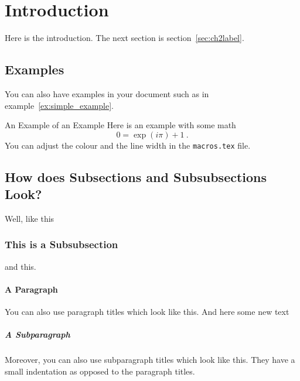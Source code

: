 \section{Introduction}\label{sec:introduction}
Here is the introduction. The next section is section~\ref{sec:ch2label}.

\subsection{Examples}
You can also have examples in your document such as in example~\ref{ex:simple_example}.
\begin{example}{An Example of an Example}
  \label{ex:simple_example}
  Here is an example with some math
  \begin{equation}
    0 = \exp(i\pi)+1\ .
  \end{equation}
  You can adjust the colour and the line width in the {\tt macros.tex} file.
\end{example}

\subsection{How does Subsections and Subsubsections Look?}
Well, like this
\subsubsection{This is a Subsubsection}
and this.

\paragraph{A Paragraph}
You can also use paragraph titles which look like this. And here some new text

\subparagraph{A Subparagraph} Moreover, you can also use subparagraph titles which look like this. They have a small indentation as opposed to the paragraph titles.


